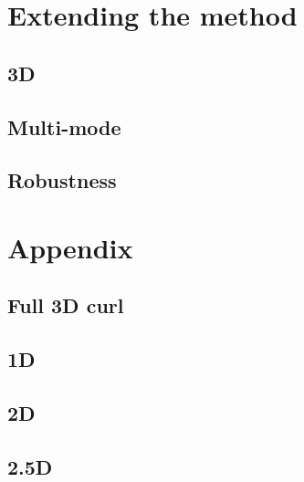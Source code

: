 \section{Extending the method}
\subsection{3D}
\subsection{Multi-mode}
\subsection{Robustness}


\section{Appendix}
\subsection{Full 3D curl}
\subsection{1D}
\subsection{2D}
\subsection{2.5D}
